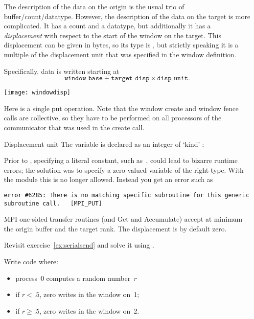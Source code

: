 The description of the data on the origin is the usual trio of
buffer/count/datatype. However, the description of the data on the
target is more complicated. It has a count and a datatype, but additionally
it has a
\emph{displacement} with respect to the
start of the window on the target. This displacement can be given in
bytes, so its type is , but strictly speaking
it is a multiple of the displacement unit that was specified in the
window definition.

Specifically, data is written starting at
\[ \mathtt{window\_base} + \mathtt{target\_disp}\times \mathtt{disp\_unit}. \]

\texttt{[image: windowdisp]}

Here is a single put operation. Note that the window create and window fence calls
are collective, so they have to be performed on all processors
of the communicator that was used in the create call.
%

\begin{fortrannote}{Displacement unit}
  The  variable is declared as an integer of `kind'
  :

Prior to ,
specifying a literal constant, such as~, could lead to bizarre
runtime errors; the solution was to specify a zero-valued variable
of the right type.
With the  module this
is no longer allowed. Instead you get an error such as
\begin{verbatim}
error #6285: There is no matching specific subroutine for this generic subroutine call.   [MPI_PUT]
\end{verbatim}
\end{fortrannote}

\begin{pythonnote}{MPI one-sided transfer routines}
   (and Get and Accumulate)
    accept at minimum the origin buffer and the target rank.
    The displacement is by default zero.
\end{pythonnote}

\begin{exercise}
  \label{ex:rightput}
  Revisit exercise~\ref{ex:serialsend} and solve it using
  .
\end{exercise}

\begin{exercise}
  \label{ex:randomput}
  Write code where:
  \begin{itemize}
  \item
    process~0 computes a random number~$r$
  \item if $r<.5$, zero writes in the window on~1;
  \item if $r\geq .5$, zero writes in the window on~2.
  \end{itemize}
\end{exercise}

